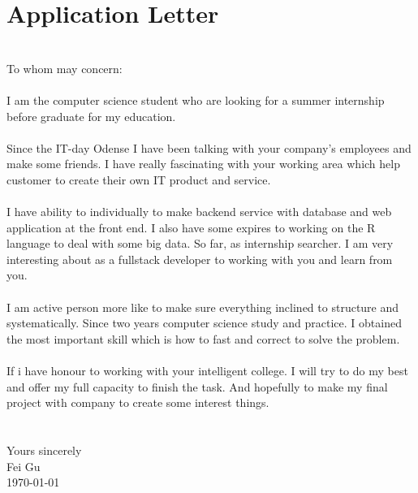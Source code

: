 \section{Application Letter}\label{sec:application-letter}
\newline
\\
To whom may concern:
\\
\paragraph{}
I am the computer science student who are looking for a summer internship before graduate
for my education.
\\
\paragraph{}
Since the IT-day Odense I have been talking with your company's employees and make some friends.
I have really fascinating with your working area which help customer to create their own IT product
and service.
\\
\paragraph{}
I have ability to individually to make backend service with database and web application at the front end.
I also have some expires to working on the R language to deal with some big data.
So far, as internship searcher.
I am very interesting about as a fullstack developer to working with you and learn from you.
\\
\paragraph{}
I am active person more like to make sure everything inclined to structure and systematically.
Since two years computer science study and practice.
I obtained the most important skill which is how to fast and correct to solve the problem.
\\
\paragraph{}
If i have honour to working with your intelligent college.
I will try to do my best and offer my full capacity to finish the task.
And hopefully to make my final project with company to create some interest things.
\\

\paragraph{}
\noindent \\
Yours sincerely\\
Fei Gu\\
\today